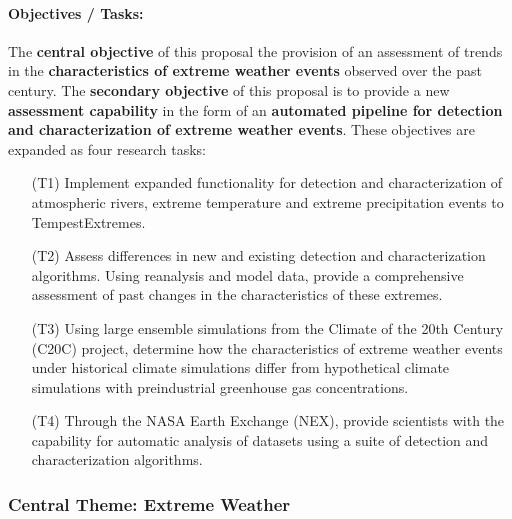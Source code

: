 \documentclass[11pt]{article}
\begin{document}
\paragraph{Objectives / Tasks:}  The \textbf{central objective} of this proposal the provision of an assessment of trends in the \textbf{characteristics of extreme weather events} observed over the past century.  The \textbf{secondary objective} of this proposal is to provide a new \textbf{assessment capability} in the form of an \textbf{automated pipeline for detection and characterization of extreme weather events}.  These objectives are expanded as four research tasks: 
\begin{itemize}
\item[(T1)] Implement expanded functionality for detection and characterization of atmospheric rivers, extreme temperature and extreme precipitation events to TempestExtremes.

\item[(T2)] Assess differences in new and existing detection and characterization algorithms.  Using reanalysis and model data, provide a comprehensive assessment of past changes in the characteristics of these extremes.

\item[(T3)] Using large ensemble simulations from the Climate of the 20th Century (C20C) project, determine how the characteristics of extreme weather events under historical climate simulations differ from hypothetical climate simulations with preindustrial greenhouse gas concentrations.


\item[(T4)] Through the NASA Earth Exchange (NEX), provide scientists with the capability for automatic analysis of datasets using a suite of detection and characterization algorithms. 
\end{itemize}


\subsubsection{Central Theme: Extreme Weather}
\end{document}
